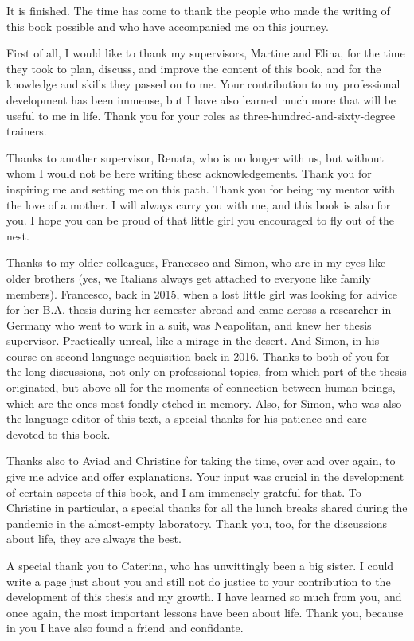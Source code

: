 \addchap{\lsAcknowledgementTitle}
It is finished. The time has come to thank the people who made the writing of this book possible and who have accompanied me on this journey.

First of all, I would like to thank my supervisors, Martine and Elina, for the time they took to plan, discuss, and improve the content of this book, and for the knowledge and skills they passed on to me. Your contribution to my professional development has been immense, but I have also learned much more that will be useful to me in life. Thank you for your roles as three-hundred-and-sixty-degree trainers.

Thanks to another supervisor, Renata, who is no longer with us, but without whom I would not be here writing these acknowledgements. Thank you for inspiring me and setting me on this path. Thank you for being my mentor with the love of a mother. I will always carry you with me, and this book is also for you. I hope you can be proud of that little girl you encouraged to fly out of the nest.

Thanks to my older colleagues, Francesco and Simon, who are in my eyes like older brothers (yes, we Italians always get attached to everyone like family members). Francesco, back in 2015, when a lost little girl was looking for advice for her B.A. thesis during her semester abroad and came across a researcher in Germany who went to work in a suit, was Neapolitan, and knew her thesis supervisor. Practically unreal, like a mirage in the desert. And Simon, in his course on second language acquisition back in 2016. Thanks to both of you for the long discussions, not only on professional topics, from which part of the thesis originated, but above all for the moments of connection between human beings, which are the ones most fondly etched in memory. Also, for Simon, who was also the language editor of this text, a special thanks for his patience and care devoted to this book.

Thanks also to Aviad and Christine for taking the time, over and over again, to give me advice and offer explanations. Your input was crucial in the development of certain aspects of this book, and I am immensely grateful for that. To Christine in particular, a special thanks for all the lunch breaks shared during the pandemic in the almost-empty laboratory. Thank you, too, for the discussions about life, they are always the best.

A special thank you to Caterina, who has unwittingly been a big sister. I could write a page just about you and still not do justice to your contribution to the development of this thesis and my growth. I have learned so much from you, and once again, the most important lessons have been about life. Thank you, because in you I have also found a friend and confidante.

